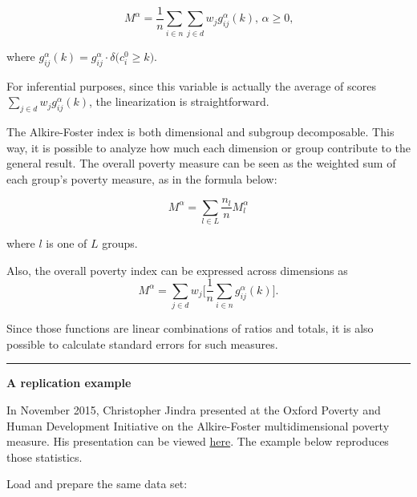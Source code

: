 \documentclass[]{book}
\begin{document}
\[
M^\alpha = \frac{1}{n} \sum_{i \in n} \sum_{j \in d} w_j g_{ij}^{\alpha}(k) \text{, } \alpha \geq 0 \text{,}
\]

where
\(g_{ij}^{\alpha}(k) = g_{ij}^\alpha \cdot \delta \big( c^0_i \geqslant k \big)\).

For inferential purposes, since this variable is actually the average of
scores \(\sum_{j \in d} w_j g_{ij}^{\alpha}(k)\), the linearization is
straightforward.

The Alkire-Foster index is both dimensional and subgroup decomposable.
This way, it is possible to analyze how much each dimension or group
contribute to the general result. The overall poverty measure can be
seen as the weighted sum of each group's poverty measure, as in the
formula below:

\[
M^\alpha = \sum_{l \in L} \frac{ n_l }{ n } M^\alpha_{l}
\]

where \(l\) is one of \(L\) groups.

Also, the overall poverty index can be expressed across dimensions as \[
M^\alpha = \sum_{j \in d} w_j \bigg[ \frac{1}{n} \sum_{i \in n} g_{ij}^\alpha (k) \bigg] \text{.}
\]

Since those functions are linear combinations of ratios and totals, it
is also possible to calculate standard errors for such measures.

\begin{center}\rule{0.5\linewidth}{\linethickness}\end{center}

\textbf{A replication example}

In November 2015, Christopher Jindra presented at the Oxford Poverty and
Human Development Initiative on the Alkire-Foster multidimensional
poverty measure. His presentation can be viewed
\href{http://www.ophi.org.uk/wp-content/uploads/Jindra_151109_OPHISeminar.pdf}{here}.
The example below reproduces those statistics.

Load and prepare the same data set:
\end{document}
